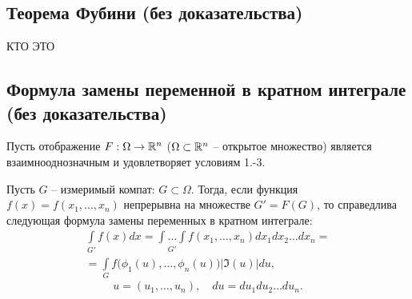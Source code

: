 \subsection{Теорема Фубини (без доказательства)}

КТО ЭТО

\newpage

\subsection{Формула замены переменной в кратном интеграле (без доказательства)}

\begin{theorem}
    Пусть отображение $ F: \Omega \rightarrow \mathbb{R}^n $ ($ \Omega \subset \mathbb{R}^n $ -- открытое множество) является взаимнооднозначным и удовлетворяет условиям 1.-3.

    Пусть $ G $ -- измеримый компат: $ G \subset \Omega $. Тогда, если функция $ f(x) = f(x_1,\ldots,x_n) $ непрерывна на множестве $ G'=F(G) $, то справедлива следующая формула замены переменных в кратном интеграле:
    \begin{multline*}
        \int\limits_{G'}f(x)dx = \underset{G'}{\int\ldots\int}f(x_1,\ldots,x_n)dx_1dx_2\ldots dx_n = \\
        = \int\limits_G f\big(\phi_1(u),\ldots,\phi_n(u)\big)\big|\mathfrak{I}(u)\big|du,
    \end{multline*}
    \[
        u = (u_1,\ldots,u_n), \quad du = du_1du_2\ldots du_n.
    \]
\end{theorem}